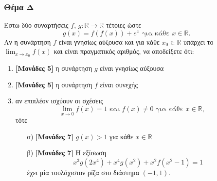 \documentclass[12pt]{article}
\begin{document}
  \section*{Θέμα Δ}
    \noindent
    Έστω δύο συναρτήσεις $f$, $g:\mathbb{R}\to\mathbb{R}$ τέτοιες ώστε $$g(x)=f\left(f(x)\right)+e^x \text{ για κάθε } x\in\mathbb{R}.$$
    Αν η συνάρτηση $f$ είναι γνησίως αύξουσα και για κάθε $x_0\in\mathbb{R}$ υπάρχει το $\lim_{x\to x_0}f(x)$ και είναι πραγματικός αριθμός, να αποδείξετε ότι:
    \begin{enumerate}
      \item \textbf{[Μονάδες 5]} η συνάρτηση $g$ είναι γνησίως αύξουσα
      \item \textbf{[Μονάδες 5]} η συνάρτηση $f$ είναι συνεχής
      \item αν επιπλέον ισχύουν οι σχέσεις
      $$\lim_{x\to 0}f(x)=1 \text{ και } f(x)\ne 0 \text{ για κάθε } x\in\mathbb{R},$$ τότε
      \begin{enumerate}
        \item [α)]  \textbf{[Μονάδες 7]} $g(x)>1$ για κάθε $x\in\mathbb{R}$
        \item [β)]  \textbf{[Μονάδες 7]} Η εξίσωση
        $$x^3g\left(2x^4\right)+x^4g\left(x^2\right)+x^2f\left(x^2-1\right)=1$$
        έχει μία τουλάχιστον ρίζα στο διάστημα $(-1,1)$.
      \end{enumerate}
    \end{enumerate}

\vspace{3\baselineskip}

\part*{}
\end{document}
